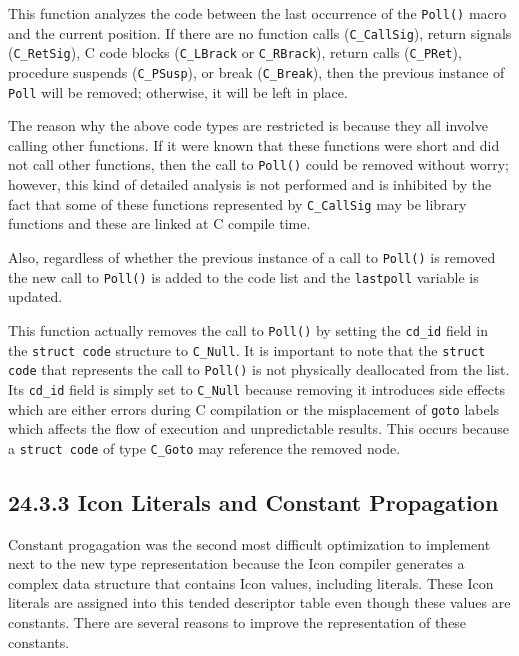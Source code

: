 This function analyzes the code between the last occurrence of the
\texttt{Poll()} macro and the current position. If there are no
function calls (\texttt{C\_CallSig}), return signals
(\texttt{C\_RetSig}), C code blocks (\texttt{C\_LBrack} or
\texttt{C\_RBrack}), return calls (\texttt{C\_PRet}), procedure
suspends (\texttt{C\_PSusp}), or break (\texttt{C\_Break}), then the
previous instance of \texttt{Poll} will be removed; otherwise, it will
be left in place.

The reason why the above code types are restricted is because they all
involve calling other functions. If it were known that these functions
were short and did not call other functions, then the call to
\texttt{Poll()} could be removed without worry; however, this kind of
detailed analysis is not performed and is inhibited by the fact that
some of these functions represented by \texttt{C\_CallSig} may be
library functions and these are linked at C compile time.

Also, regardless of whether the previous instance of a call to
\texttt{Poll()} is removed the new call to \texttt{Poll()} is added to
the code list and the \texttt{lastpoll} variable is updated.



This function actually removes the call to \texttt{Poll()} by setting
the \texttt{cd\_id} field in the \texttt{struct code} structure to
\texttt{C\_Null}. It is important to note that the \texttt{struct
code} that represents the call to \texttt{Poll()} is not physically
deallocated from the list. Its \texttt{cd\_id} field is simply set
to \texttt{C\_Null} because removing it introduces side effects which
are either errors during C compilation or the misplacement of
\texttt{goto} labels which affects the flow of execution and
unpredictable results. This occurs because a \texttt{struct code}
of type \texttt{C\_Goto} may reference the removed node.

\subsection[24.3.3 Icon Literals and Constant Propagation]{24.3.3 Icon Literals and Constant Propagation}

Constant progagation was the second most difficult optimization to
implement next to the new type representation because the Icon
compiler generates a complex data structure that contains Icon values,
including literals. These Icon literals are assigned into this tended
descriptor table even though these values are constants. There are
several reasons to improve the representation of these constants.

